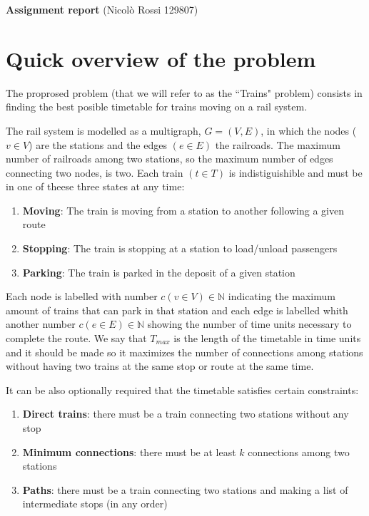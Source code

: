 \documentclass[11pt]{article}
\begin{document}
\newtheorem{Definizione}{Definizione}
\newtheorem{Lemma}{Lemma}
\newtheorem{Teorema}{Teorema}



\textbf{Assignment report} (Nicolò Rossi 129807)


\section{Quick overview of the problem}

The proprosed problem (that we will refer to as the ``Trains" problem) consists in finding the best posible timetable for trains moving on a rail system. 

The rail system is modelled as a multigraph, $G=(V,E)$, in which the nodes ($v\in V$) are the stations and the edges $(e\in E)$ the railroads. The maximum number of railroads among two stations, so the maximum number of edges connecting two nodes, is two.
Each train $(t \in T)$ is indistiguishible and must be in one of theese three states at any time:

\begin{enumerate}
\item \textbf{Moving}: The train is moving from a station to another following a given route
\item \textbf{Stopping}: The train is stopping at a station to load/unload passengers
\item \textbf{Parking}: The train is parked in the deposit of a given station
\end{enumerate} 

Each node is labelled with number $c(v \in V) \in \mathbb{N}$ indicating the maximum amount of trains that can park in that station and each edge is labelled whith another number $c(e \in E) \in \mathbb{N}$ showing the number of time units necessary to complete the route.
We say that $T_{max}$ is the length of the timetable in time units and it should be 
made so it maximizes the number of connections among stations without having two 
trains at the same stop or route at the same time. 

It can be also optionally required that the timetable satisfies certain constraints:
\begin{enumerate}
\item \textbf{Direct trains}: there must be a train connecting two stations without any stop
\item \textbf{Minimum connections}: there must be at least $k$ connections among two stations
\item \textbf{Paths}: there must be a train connecting two stations and making a list of intermediate stops (in any order)
\end{enumerate} 
\end{document}
